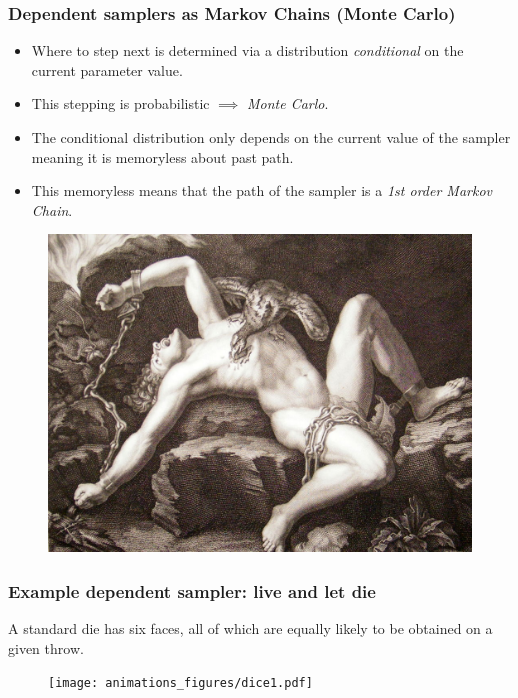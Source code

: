 \documentclass[handout]{beamer}
\begin{document}
\begin{frame}
	\frametitle{Dependent samplers as Markov Chains (Monte Carlo)}
	\begin{itemize}
		\item<2-> Where to step next is determined via a distribution \textit{conditional} on the current parameter value.
		\item<3-> This stepping is probabilistic $\implies$ \textit{Monte Carlo}.
		\item<4-> The conditional distribution only depends on the current value of the sampler meaning it is memoryless about past path.
		\item<5-> This memoryless means that the path of the sampler is a \textit{1st order Markov Chain}.
	\end{itemize}
	
	\begin{figure}[ht]
		\centerline{\includegraphics[width=1\textwidth]{animations_figures/prometheus.jpg}}
	\end{figure}
	
\end{frame}


\begin{frame}
	\frametitle{Example dependent sampler: live and let die}
	 A standard die has six faces, all of which are equally likely to be obtained on a given throw.
	
	\begin{figure}[ht]
		\centerline{\texttt{[image: animations\_figures/dice1.pdf]}}
	\end{figure}
	
\end{frame}
\end{document}
